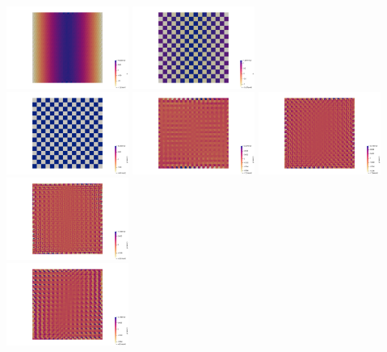 \begin{center}
\includegraphics[width=4cm]{python_codes/fieldstone_78/results/mms_dh/16x16/p6}
\includegraphics[width=4cm]{python_codes/fieldstone_78/results/mms_dh/16x16/p7}\\
\includegraphics[width=4cm]{python_codes/fieldstone_78/results/mms_dh/16x16/perror0}
\includegraphics[width=4cm]{python_codes/fieldstone_78/results/mms_dh/16x16/perror1}
\includegraphics[width=4cm]{python_codes/fieldstone_78/results/mms_dh/16x16/perror2}
\includegraphics[width=4cm]{python_codes/fieldstone_78/results/mms_dh/16x16/perror3}\\
\includegraphics[width=4cm]{python_codes/fieldstone_78/results/mms_dh/16x16/perror4}

\end{center}
